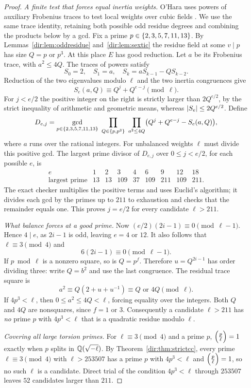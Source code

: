 \begin{proof}
\emph{A finite test that forces equal inertia weights.} O'Hara uses powers of auxiliary
Frobenius traces to test local weights over cubic fields
\cite[\S2.3]{OHara2026Heavenly}. We use the same trace identity, retaining both
possible odd residue degrees and combining the products below by a gcd. Fix a prime
$p\in\{2,3,5,7,11,13\}$. By Lemmas~\ref{dir:lem:oddresidue} and~\ref{dir:lem:sextic} the residue
field at some $v\mid p$ has size $Q=p$ or $p^3$. At this place $E$ has good reduction.
Let $a$ be its Frobenius trace, with $a^2\le4Q$. The traces of powers satisfy
\[
 S_0=2,\quad S_1=a,\quad S_k=aS_{k-1}-QS_{k-2}.
\]
Reduction of the two eigenvalues modulo $\ell$ and the two inertia congruences give
\[
 S_e(a,Q)\equiv Q^j+Q^{e-j}\pmod\ell .
\]
For $j<e/2$ the positive integer on the right is strictly larger than $2Q^{e/2}$, by
the strict inequality of arithmetic and geometric means, whereas
$\lvert S_e\rvert\le2Q^{e/2}$. Define
\[
 D_{e,j}=\gcd_{p\in\set{2,3,5,7,11,13}}\ \prod_{Q\in\set{p,p^3}}\
 \prod_{a^2\le4Q}\bigl(Q^j+Q^{e-j}-S_e(a,Q)\bigr),
\]
where $a$ runs over the rational integers. For unbalanced weights $\ell$ must divide
this positive gcd. The largest prime divisor of $D_{e,j}$ over $0\le j<e/2$, for each
possible $e$, is
\[
 \begin{array}{c|rrrrrrrr}
 e&1&2&3&4&6&9&12&18\\ \hline
 \text{largest prime}&13&13&109&37&109&211&109&211 .
 \end{array}
\]
The exact checker multiplies the positive terms and uses Euclid's algorithm; it divides each gcd by the
primes up to $211$ to exhaustion and checks that the remainder equals one. This proves
$j=e/2$ for every candidate $\ell>211$.

\emph{What balance forces at a good prime.} Now $(e/2)(2i-1)\equiv0\pmod{\ell-1}$.
Hence $4\mid e$, as $2i-1$ is odd, leaving $e=4$ or $12$. It also follows that
$\ell\equiv3\pmod4$ and
\[
 6(2i-1)\equiv0\pmod{\ell-1}.
\]
If $p\bmod\ell$ is a nonzero square, so is $Q=p^f$. Therefore $u=Q^{2i-1}$ has order
dividing three: write $Q=b^2$ and use the last congruence. The residual trace square
is
\[
 a^2\equiv Q(2+u+u^{-1})\equiv Q\text{ or }4Q\pmod\ell .
\]
If $4p^3<\ell$, then $0\le a^2\le4Q<\ell$, forcing equality over the integers. Both
$Q$ and $4Q$ are nonsquares, since $f=1$ or $3$. Consequently a candidate $\ell>211$
has \emph{no} prime $p$ with $4p^3<\ell$ that is a quadratic residue modulo $\ell$.

\emph{Covering all large torsion primes.} For $\ell\equiv3\pmod4$ and a prime $p$,
$\Bigl(\frac{p}{\ell}\Bigr)=1$ exactly when $p$ splits in $\mathbb{Q}(\sqrt{-\ell})$. By
Theorem~\ref{dir:thm:strictcc}, every prime $\ell\equiv3\pmod4$ with $\ell>253507$ has a prime
$p$ with $4p^3<\ell$ and $\Bigl(\frac{p}{\ell}\Bigr)=1$, so no such $\ell$ is a candidate. Direct
trial of the condition $4p^3<\ell$ through $253507$ leaves $52$ candidates larger than
$211$.


\end{proof}
